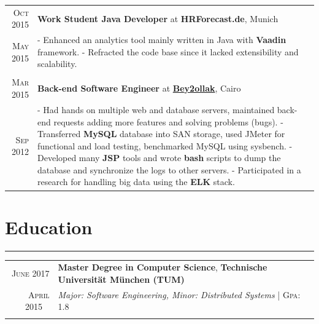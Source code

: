\documentclass[a4paper,13pt]{article}
\begin{document}
\begin{adjustwidth}{-3cm}{}
\begin{tabular}{r|p{17.5cm}}

\textsc{Oct 2015} & \textbf{Work Student Java Developer} at \textbf{HRForecast.de}, Munich \\
\textsc{May 2015} & \footnotesize{ - Enhanced an analytics tool mainly written in Java with \textbf{Vaadin} framework. \newline
- Refracted the code base since it lacked extensibility and scalability.
} \\ 
\multicolumn{2}{c}{} \\


\textsc{Mar 2015} & \textbf{Back-end Software Engineer} at \href{http://desktop.bey2ollak.com/features-mentions/}{\textbf{Bey2ollak}}, Cairo \\
\textsc{Sep 2012} & 

\footnotesize{
	- Had hands on multiple web and database servers, maintained back-end requests adding more features and solving problems (bugs).\newline 
	- Transferred \textbf{MySQL} database into SAN storage, used JMeter for functional and load testing, benchmarked MySQL using sysbench.\newline
	- Developed many \textbf{JSP} tools and wrote \textbf{bash} scripts to dump the database and synchronize the logs to other servers.\newline
	- Participated in a research for handling big data using the \textbf{ELK} stack.
}
\end{tabular}





\section{Education}
\rule[0pt]{20cm}{0.5pt}

\begin{tabular}{r|p{17.5cm}}
		

\textsc{June 2017} & \textbf{Master Degree in Computer Science}, \textbf{Technische Universität München (TUM)} \\ \textsc{April} 2015 \
& \small\emph{Major: Software Engineering, Minor: Distributed Systems}
 \normalsize\footnotesize \hfill| \normalsize \textsc{Gpa}: 1.8
\\ \multicolumn{2}{c}{} \\


\end{tabular}
\end{adjustwidth}
\end{document}
